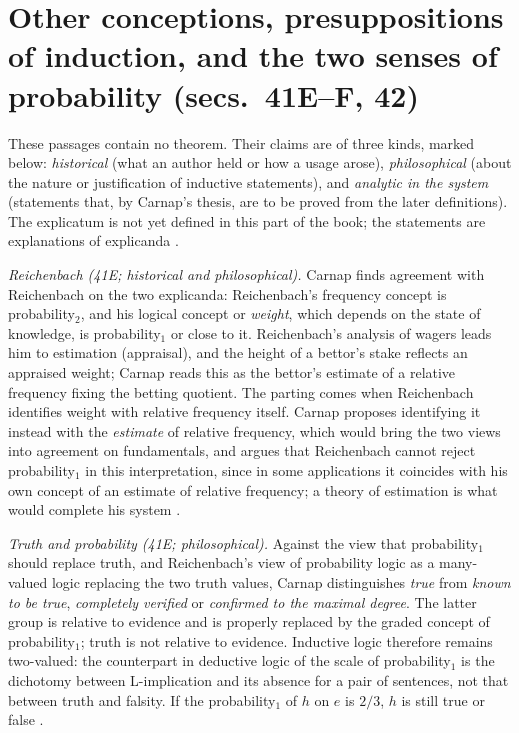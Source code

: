 \section{Other conceptions, presuppositions of induction, and the two senses of probability (secs.~41E--F, 42)}
\label{sec:p15-w02b-p15-029-two-senses}

These passages contain no theorem. Their claims are of three kinds,
marked below: \emph{historical} (what an author held or how a usage
arose), \emph{philosophical} (about the nature or justification of
inductive statements), and \emph{analytic in the system} (statements
that, by Carnap's thesis, are to be proved from the later definitions).
The explicatum is not yet defined in this part of the book; the
statements are explanations of explicanda
\cite[sec.~41F, p.~182]{Carnap1950Probability}.

\emph{Reichenbach (41E; historical and philosophical).} Carnap finds
agreement with Reichenbach on the two explicanda: Reichenbach's
frequency concept is probability\(_2\), and his logical concept or
\emph{weight}, which depends on the state of knowledge, is
probability\(_1\) or close to it. Reichenbach's analysis of wagers
leads him to estimation (appraisal), and the height of a bettor's
stake reflects an appraised weight; Carnap reads this as the bettor's
estimate of a relative frequency fixing the betting quotient. The
parting comes when Reichenbach identifies weight with relative
frequency itself. Carnap proposes identifying it instead with the
\emph{estimate} of relative frequency, which would bring the two
views into agreement on fundamentals, and argues that Reichenbach
cannot reject probability\(_1\) in this interpretation, since in some
applications it coincides with his own concept of an estimate of
relative frequency; a theory of estimation is what would complete his
system \cite[sec.~41E, pp.~175--176]{Carnap1950Probability}.

\emph{Truth and probability (41E; philosophical).} Against the view
that probability\(_1\) should replace truth, and Reichenbach's view of
probability logic as a many-valued logic replacing the two truth
values, Carnap distinguishes \emph{true} from \emph{known to be true},
\emph{completely verified} or \emph{confirmed to the maximal degree}.
The latter group is relative to evidence and is properly replaced by
the graded concept of probability\(_1\); truth is not relative to
evidence. Inductive logic therefore remains two-valued: the
counterpart in deductive logic of the scale of probability\(_1\) is the
dichotomy between L-implication and its absence for a pair of
sentences, not that between truth and falsity. If the probability\(_1\)
of \(h\) on \(e\) is \(2/3\), \(h\) is still true or false
\cite[sec.~41E, pp.~176--177]{Carnap1950Probability}.

